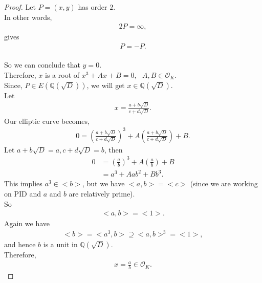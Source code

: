 \documentclass[12pt,leqno]{amsart}
\newcommand{\<}{\langle}
\renewcommand{\>}{\rangle}
\theoremstyle{definition}
\numberwithin{equation}{section}
\begin{document}
 \begin{proof}
     Let $P=(x,y)$ has order $2$.\\
    In other words,
    \begin{align*}
        2P=\infty,
    \end{align*}
    gives
    \begin{align*}
        P=-P.
    \end{align*}
    \\
    So we can conclude that $y=0$.\\
    Therefore, $x$ is a root of $x^3+Ax+B=0,~~~ A,B\in{\mathcal{O}_K}$.\\
    Since, $P\in E(\mathbb Q(\sqrt{D}))$, we will get $x\in\mathbb Q(\sqrt{D})$.\\
    Let
    \begin{align*}
        x=\frac{a+b\sqrt{D}}{c+d\sqrt{D}}.
    \end{align*}
    Our elliptic curve becomes,
    \begin{align*}
        0=\left(\frac{a+b\sqrt{D}}{c+d\sqrt{D}}\right)^3+A\left(\frac{a+b\sqrt{D}}{c+d\sqrt{D}}\right)+B.
    \end{align*}
    Let $a+b\sqrt{D}=a, c+d\sqrt{D}=b$, then
    \begin{align*}
        0&=\left(\frac{a}{b}\right)^3+A\left(\frac{a}{b}\right)+B\\
        &=a^3+Aab^2+Bb^3.
    \end{align*}
    This implies $a^3\in<b>$, but we have $<a,b>=<c>$ (since we are working on PID and $a$ and $b$ are relatively prime).\\
    So
    \begin{align*}
        <a,b>=<1>.
    \end{align*}
    Again we have
    \begin{align*}
        <b>=<a^3,b>\supseteq <a,b>^3=<1>,
    \end{align*}
    and hence $b$ is a unit in $\mathbb Q(\sqrt{D})$.\\
    Therefore,
    \begin{align*}
        x=\frac{a}{b}\in {\mathcal{O}_K}.
    \end{align*}
 \end{proof}
\end{document}
